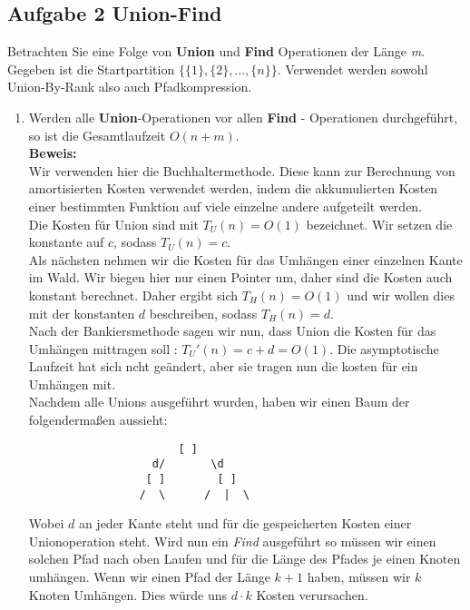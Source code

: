 \documentclass[11pt,a4paper,ngerman]{article}
\begin{document}
\subsection*{Aufgabe 2 \mdseries Union-Find}

Betrachten Sie eine Folge von \textbf{Union} und \textbf{Find} Operationen der Länge \emph{m}. Gegeben ist die Startpartition $\{\{ 1 \} , \{ 2 \} , ... , \{ n \} \}$. Verwendet werden sowohl Union-By-Rank also auch Pfadkompression.

\begin{enumerate}[\bfseries (a)]

\item Werden alle \textbf{Union}-Operationen vor allen \textbf{Find} - Operationen durchgeführt, so ist die Gesamtlaufzeit $O(n + m)$.\\

\textbf{Beweis:}\\

Wir verwenden hier die Buchhaltermethode. Diese kann zur Berechnung von amortisierten Kosten verwendet werden, indem die akkumulierten Kosten einer bestimmten Funktion auf viele einzelne andere aufgeteilt werden.\\

Die Kosten für Union sind mit $T_U(n) = O(1)$ bezeichnet. Wir setzen die konstante auf $c$, sodass $T_U(n) = c$.\\

Als nächsten nehmen wir die Kosten für das Umhängen einer einzelnen Kante im Wald. Wir biegen hier nur einen Pointer um, daher sind die Kosten auch konstant berechnet. Daher ergibt sich $T_H(n) = O(1)$ und wir wollen dies mit der konstanten $d$ beschreiben, sodass $T_H(n) = d$.\\

Nach der Bankiersmethode sagen wir nun, dass Union die Kosten für das Umhängen mittragen soll : $T_U'(n) = c + d = O(1)$. Die asymptotische Laufzeit hat sich ncht geändert, aber sie tragen nun die kosten für ein Umhängen mit.\\

Nachdem alle Unions ausgeführt wurden, haben wir einen Baum der folgendermaßen aussieht:
\begin{lstlisting}
                       [ ]
                   d/       \d
                  [ ]        [ ]
                 /  \      /  |  \
\end{lstlisting}
Wobei $d$ an jeder Kante steht und für die gespeicherten Kosten einer Unionoperation steht. Wird nun ein \emph{Find} ausgeführt so müssen wir einen solchen Pfad nach oben Laufen und für die Länge des Pfades je einen Knoten umhängen. Wenn wir einen Pfad der Länge $k+1$ haben, müssen wir $k$ Knoten Umhängen. Dies würde uns $d\cdot k$ Kosten verursachen.\\


\end{enumerate}
\end{document}
